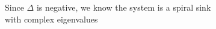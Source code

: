 \documentclass[preview]{standalone}
\begin{document}
\begin{center}
\raggedright
                Since $\Delta$ is negative, we know the system is a spiral sink \\
                with complex eigenvalues
\end{center}
\end{document}
